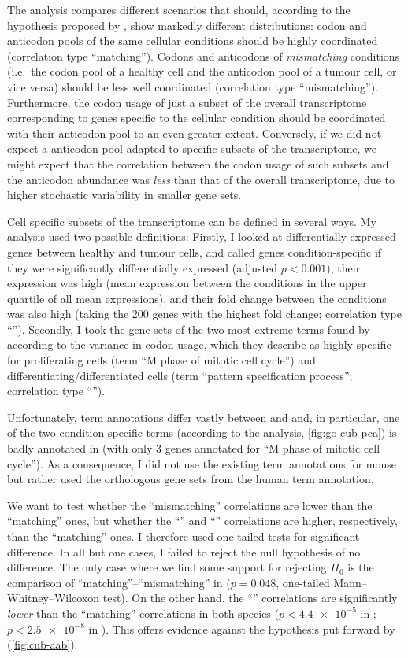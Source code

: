 The analysis compares different scenarios that should, according to the
hypothesis proposed by \citet{Gingold:2014}, show markedly different
distributions: codon and anticodon pools of the same cellular conditions should
be highly coordinated (correlation type “matching”). Codons and anticodons of
\emph{mismatching} conditions (i.e.\ the codon pool of a healthy cell and the
anticodon pool of a tumour cell, or vice versa) should be less well coordinated
(correlation type “mismatching”). Furthermore, the codon usage of just a subset
of the overall transcriptome corresponding to genes specific to the cellular
condition should be coordinated with their anticodon pool to an even greater
extent. Conversely, if we did not expect a \trna anticodon pool adapted to
specific subsets of the transcriptome, we might expect that the correlation
between the codon usage of such subsets and the anticodon abundance was
\emph{less} than that of the overall transcriptome, due to higher stochastic
variability in smaller gene sets.

Cell specific subsets of the transcriptome can be defined in several ways. My
analysis used two possible definitions: Firstly, I looked at differentially
expressed genes between healthy and tumour cells, and called genes
condition-specific if they were significantly differentially expressed (adjusted
\(p < 0.001\)), their expression was high (mean expression between the
conditions in the upper quartile of all mean expressions), and their fold change
between the conditions was also high (taking the \num{200} genes with the
highest fold change; correlation type “”). Secondly, I took the gene
sets of the two most extreme \go terms found by \citet{Gingold:2014} according
to the variance in codon usage, which they describe as highly specific for
proliferating cells (\go term “M phase of mitotic cell cycle”) and
differentiating/differentiated cells (\go term “pattern specification process”;
correlation type “”).

Unfortunately, \go term annotations differ vastly between \hsa and \mmu and, in
particular, one of the two condition specific \go terms (according to the \pca
analysis, \cref{fig:go-cub-pca}) is badly annotated in \mmu (with only \num{3}
genes annotated for “M phase of mitotic cell cycle”). As a consequence, I did
not use the existing \go term annotations for mouse but rather used the
orthologous gene sets from the human \go term annotation.

We want to test whether the “mismatching” correlations are lower than the
“matching” ones, but whether the “” and “” correlations are
higher, respectively, than the “matching” ones. I therefore used one-tailed
tests for significant difference. In all but one cases, I failed to reject the
null hypothesis of no difference. The only case where we find some support for
rejecting \(H_0\) is the comparison of “matching”--“mismatching” in \hsa (\(p =
0.048\), one-tailed Mann–Whitney–Wilcoxon test). On the other hand, the
“” correlations are significantly \emph{lower} than the “matching”
correlations in both species (\(p < \num{4.4e-5}\) in \mmu; \(p < \num{2.5e-8}\)
in \hsa). This offers evidence against the hypothesis put forward by
\citet{Gingold:2014} (\cref{fig:cub-aab}).

